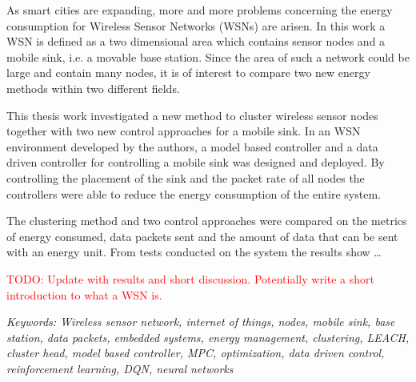 \noindent As smart cities are expanding, more and more problems concerning the energy consumption for Wireless Sensor Networks (WSNs) are arisen. In this work a WSN is defined as a two dimensional area which contains sensor nodes and a mobile sink, i.e. a movable base station. Since the area of such a network could be large and contain many nodes, it is of interest to compare two new energy methods within two different fields. \newline

\noindent This thesis work investigated a new method to cluster wireless sensor nodes together with two new control approaches for a mobile sink. In an WSN environment developed by the authors, a model based controller and a data driven controller for controlling a mobile sink was designed and deployed. By controlling the placement of the sink and the packet rate of all nodes the controllers were able to reduce the energy consumption of the entire system. \newline

\noindent The clustering method and two control approaches were compared on the metrics of energy consumed, data packets sent and the amount of data that can be sent with an energy unit. From tests conducted on the system the results show \dots \newline   


\noindent \textcolor{red}{TODO: Update with results and short discussion. Potentially write a short introduction to what a WSN is.}\newline

\noindent \textit{Keywords: Wireless sensor network, internet of things, nodes, mobile sink, base station, data packets, embedded systems, energy management, clustering, LEACH, cluster head, model based controller, MPC, optimization, data driven control, reinforcement learning, DQN, neural networks}